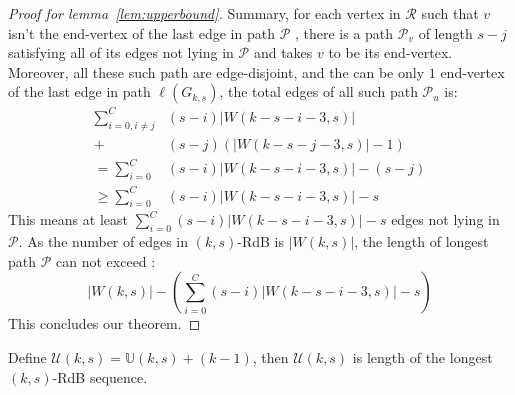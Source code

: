 \begin{proof}[Proof for lemma~\ref{lem:upperbound}]
    
    
    
    
    Summary, for each vertex in $\mathscr{R}$ such that $v$ isn't the end-vertex of the last edge in path $\mathscr{P}$ , there is a path $\mathcal{P}_{v}$ of length $s-j$ satisfying all of its edges not lying in $\mathscr{P}$ and takes $v$ to be its end-vertex. Moreover, all these such path are edge-disjoint, and the can be only $1$ end-vertex of the last edge in path $\ell(G_{k,s})$, the total edges of all such path $\mathcal{P}_{u}$ is:
    \begin{align*}
        \sum_{i=0,i\neq j}^{C} &(s-i)\lvert W(k-s-i-3,s) \rvert \\
        + &(s-j)(\lvert W(k-s-j-3,s)\rvert-1)\\
        = \sum_{i=0}^{C} &(s-i)\lvert W(k-s-i-3,s) \rvert - (s-j) \\
        \geq \sum_{i=0}^{C} &(s-i)\lvert W(k-s-i-3,s) \rvert -s  
    \end{align*}
    This means at least $\sum_{i=0}^{C} (s-i)\lvert W(k-s-i-3,s) \rvert -s$ edges not lying in $\mathscr{P}$. As the number of edges in $(k,s)$-RdB is $\lvert W(k,s)\rvert$, the length of longest path $\mathscr{P}$ can not exceed : 
    \[\lvert W(k,s)\rvert - (\sum_{i=0}^{C} (s-i)\lvert W(k-s-i-3,s) \rvert- s)\]
    This concludes our theorem.
\end{proof}

Define $\mathcal{U}(k,s) = \mathbb{U}(k,s)+(k-1)$, then $\mathcal{U}(k,s)$ is length of the longest $(k,s)$-RdB sequence.